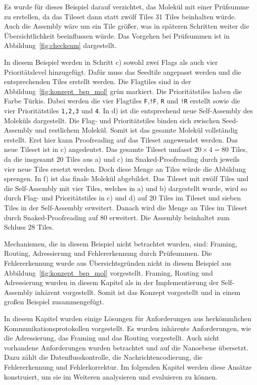 Es wurde für dieses Beispiel darauf verzichtet, das Molekül mit einer Prüfsumme zu erstellen, da das Tileset dann statt zwölf Tiles 31 Tiles beinhalten würde. Auch die Assembly wäre um ein Tile größer, was in späteren Schritten weiter die Übersichtlichkeit beeinflussen würde. Das Vorgehen bei Prüfsummen ist in Abbildung~\ref{fig:checksum} dargestellt. 

In diesem Beispiel werden in Schritt c) sowohl zwei Flags als auch vier Prioritätslevel hinzugefügt. Dafür muss das Seedtile angepasst werden und die entsprechenden Tiles erstellt werden. Die Flagtiles sind in der Abbildung~\ref{fig:konzept_bsp_mol} grün markiert. Die Prioritätstiles haben die Farbe Türkis. Dabei werden die vier Flagtiles \texttt{F},\texttt{!F}, \texttt{R} und \texttt{!R} erstellt sowie die vier Prioritätstiles \texttt{1,2,3} und \texttt{4}. In d) ist die entsprechend neue Self-Assembly des Moleküls dargestellt. Die Flag- und Prioritätstiles binden sich zwischen Seed-Assembly und restlichem Molekül. Somit ist das gesamte Molekül vollständig erstellt. Erst hier kann Proofreading auf das Tileset angewendet werden. Das neue Tileset ist in c) angedeutet. Das gesamte Tileset umfasst $ 20 \times 4 = 80$ Tiles, da die insgesamt 20 Tiles aus a) und c) im Snaked-Proofreading durch jeweils vier neue Tiles ersetzt werden. Doch diese Menge an Tiles würde die Abbildung sprengen. In f) ist das finale Molekül abgebildet. Das Tileset mit zwölf Tiles und die Self-Assembly mit vier Tiles, welches in a) und b) dargestellt wurde, wird so durch Flag- und Prioritätstiles in c) und d) auf 20 Tiles im Tileset und sieben Tiles in der Self-Assembly erweitert. Danach wird die Menge an Tiles im Tileset durch Snaked-Proofreading auf 80 erweitert. Die Assembly beinhaltet zum Schluss 28 Tiles.

Mechanismen, die in diesem Beispiel nicht betrachtet wurden, sind: Framing, Routing, Adressierung und Fehlererkennung durch Prüfsummen. Die Fehlererkennung wurde aus Übersichtsgründen nicht in diesem Beispiel aus Abbildung~\ref{fig:konzept_bsp_mol} vorgestellt. Framing, Routing und Adressierung wurden in diesem Kapitel als in der Implementierung der Self-Assembly inhärent vorgestellt. Somit ist das Konzept vorgestellt und in einem großen Beispiel zusammengefügt.

In diesem Kapitel wurden einige Lösungen für Anforderungen aus herkömmlichen Kommunikationsprotokollen vorgestellt. Es wurden inhärente Anforderungen, wie die Adressierung, das Framing und das Routing vorgestellt. Auch nicht vorhandene Anforderungen wurden betrachtet und auf die Nanoebene übersetzt. Dazu zählt die Datenflusskontrolle, die Nachrichtencodierung, die Fehlererkennung und Fehlerkorrektur. Im folgenden Kapitel werden diese Ansätze konstruiert, um sie im Weiteren analysieren und evaluieren zu können.
